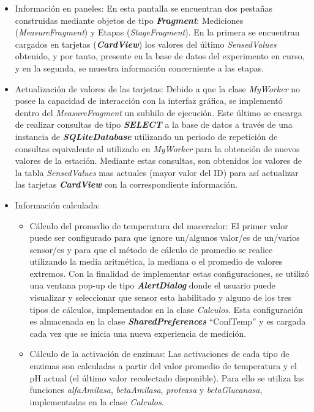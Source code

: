 \begin{itemize}
                \item Información en paneles: En esta pantalla se encuentran dos pestañas construidas mediante objetos de tipo \textbf{\textit{\gls{Fragment}}}: Mediciones (\textit{MeasureFragment}) y Etapas (\textit{StageFragment}). En la primera se encuentran cargados en tarjetas (\textbf{\textit{\gls{CardView}}}) los valores del último \textit{SensedValues} obtenido, y por tanto, presente en la base de datos del experimento en curso, y en la segunda, se muestra información concerniente a las etapas.
                
                \item Actualización de valores de las tarjetas: Debido a que la clase \textit{MyWorker} no posee la capacidad de interacción con la interfaz gráfica, se implementó dentro del \textit{MeasureFragment} un subhilo de ejecución. Este último se encarga de realizar consultas de tipo \textbf{\textit{\gls{SELECT}}} a la base de datos a través de una instancia de \textbf{\textit{\gls{SQLiteDatabase}}} utilizando un periodo de repetición de consultas equivalente al utilizado en \textit{MyWorker} para la obtención de nuevos valores de la estación. Mediante estas consultas, son obtenidos los valores de la tabla \textit{SensedValues} mas actuales (mayor valor del ID) para así actualizar las tarjetas \textbf{\textit{\gls{CardView}}} con la correspondiente información.
                
                \item Información calculada:
                \begin{itemize}
                    \item Cálculo del promedio de temperatura del macerador: El primer valor puede ser configurado para que ignore un/algunos valor/es de un/varios sensor/es y para que el método de cálculo de promedio se realice utilizando la media aritmética, la mediana o el promedio de valores extremos. Con la finalidad de implementar estas configuraciones, se utilizó una ventana pop-up de tipo \textbf{\textit{\gls{AlertDialog}}} donde el usuario puede visualizar y seleccionar que sensor esta habilitado y alguno de los tres tipos de cálculos, implementados en la clase \textit{Calculos}. Esta configuración es almacenada en la clase \textbf{\textit{SharedPreferences}} ``ConfTemp'' y es cargada cada vez que se inicia una nueva experiencia de medición. 
                
                    \item Cálculo de la activación de enzimas: Las activaciones de cada tipo de enzimas son calculadas a partir del valor promedio de temperatura y el pH actual (el último valor recolectado disponible). Para ello se utiliza las funciones \textit{alfaAmilasa}, \textit{betaAmilasa}, \textit{proteasa} y \textit{betaGlucanasa}, implementadas en la clase \textit{Calculos}. 
                

\end{itemize}
\end{itemize}
